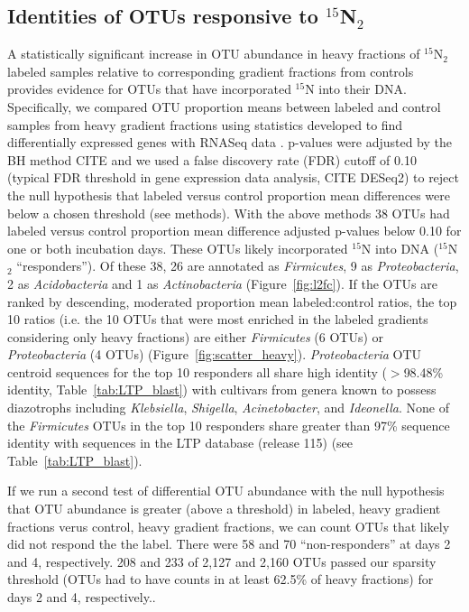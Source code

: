 \subsection{Identities of OTUs responsive to $^{15}$N$_{2}$} 
A statistically significant increase in OTU abundance in heavy fractions of
$^{15}$N$_{2}$ labeled samples relative to corresponding gradient fractions
from controls provides evidence for OTUs that have incorporated $^{15}$N into
their DNA. Specifically, we compared OTU proportion means between labeled and
control samples from heavy gradient fractions using statistics developed to
find differentially expressed genes with RNASeq data \cite{24699258, Love_2014}. p-values were adjusted by the BH method CITE and we used a false
discovery rate (FDR) cutoff of 0.10 (typical FDR threshold in gene expression
data analysis, CITE DESeq2) to reject the null hypothesis that labeled versus
control proportion mean differences were below a chosen threshold (see
methods). With the above methods 38 OTUs had labeled versus control proportion
mean difference adjusted p-values below 0.10 for one or both incubation days. These OTUs
likely incorporated $^{15}$N into DNA ($^{15}$N$_{2}$ ``responders''). Of
these 38, 26 are annotated as \textit{Firmicutes}, 9 as
\textit{Proteobacteria}, 2 as \textit{Acidobacteria} and 1 as
\textit{Actinobacteria} (Figure~\ref{fig:l2fc}). If the OTUs are ranked by
descending, moderated proportion mean labeled:control ratios, the top 10 ratios
(i.e. the 10 OTUs that were most enriched in the labeled gradients considering
only heavy fractions) are either \textit{Firmicutes} (6 OTUs) or
\textit{Proteobacteria} (4 OTUs) (Figure~\ref{fig:scatter_heavy}).
\textit{Proteobacteria} OTU centroid sequences for the top 10 responders all
share high identity ($>$98.48\% identity, Table~\ref{tab:LTP_blast}) with
cultivars from genera known to possess diazotrophs including
\textit{Klebsiella}, \textit{Shigella}, \textit{Acinetobacter}, and
\textit{Ideonella}. None of the \textit{Firmicutes} OTUs in the top 10
responders share greater than 97\% sequence identity with sequences in the LTP
database (release 115) (see Table~\ref{tab:LTP_blast}).

If we run a second test of differential OTU abundance with the null hypothesis
that OTU abundance is greater (above a threshold) in labeled, heavy gradient
fractions verus control, heavy gradient fractions, we can count OTUs that likely
did not respond the the label. There were 58 and 70 ``non-responders'' at days
2 and 4, respectively. 208 and 233 of 2,127 and 2,160 OTUs passed our sparsity
threshold (OTUs had to have counts in at least 62.5\% of heavy fractions) for
days 2 and 4, respectively..


